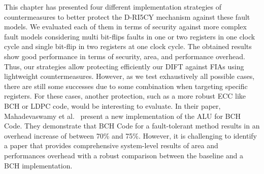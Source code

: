 This chapter has presented four different implementation strategies of countermeasures to better protect the D-RI5CY mechanism against these fault models. We evaluated each of them in terms of security against more complex fault models considering multi bit-flips faults in one or two registers in one clock cycle and single bit-flip in two registers at one clock cycle. The obtained results show good performance in terms of security, area, and performance overhead. Thus, our strategies allow protecting efficiently our DIFT against FIAs using lightweight countermeasures. However, as we test exhaustively all possible cases, there are still some successes due to some combination when targeting specific registers. For these cases, another protection, such as a more robust ECC like BCH or LDPC code, would be interesting to evaluate. In their paper, Mahadevaswamy et al.~\cite{MSS-12-ijsce} present a new implementation of the ALU for BCH Code. They demonstrate that BCH Code for a fault-tolerant method results in an overhead increase of between 70\% and 75\%. However, it is challenging to identify a paper that provides comprehensive system-level results of area and performances overhead with a robust comparison between the baseline and a BCH implementation.

